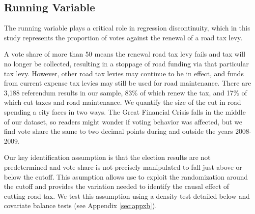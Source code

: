 










\subsection{Running Variable}

The running variable plays a critical role in regression discontinuity, which in this study represents the proportion of votes against the renewal of a road tax levy. 



A vote share of more than 50 means the renewal road tax levy fails and tax will no longer be collected, resulting in a stoppage of road funding via that particular tax levy. However, other road tax levies may continue to be in effect, and funds from current expense tax levies may still be used for road maintenance. There are 3,188 referendum results in our sample, 83\% of which renew the tax, and 17\% of which cut taxes and road maintenance. We quantify the size of the cut in road spending a city faces in two ways. The Great Financial Crisis falls in the middle of our dataset, so readers might wonder if voting behavior was affected, but we find vote share the same to two decimal points during and outside the years 2008-2009. 

Our key identification assumption is that the election results are not predetermined and vote share is not precisely manipulated to fall just above or below the cutoff. This asumption allows use to exploit the randomization around the cutoff and provides the variation needed to identify the causal effect of cutting road tax. We test this assumption using a density test detailed below and covariate balance tests (see Appendix \ref{sec:appxb}).

